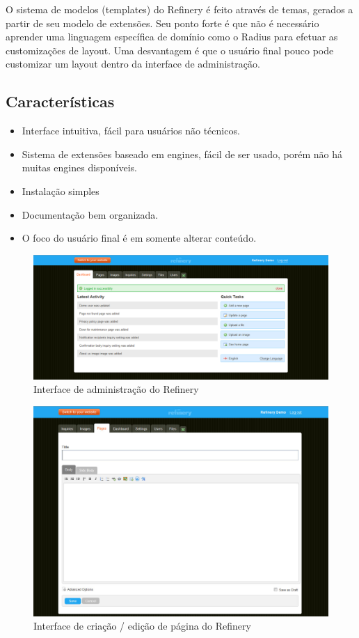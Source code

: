 O sistema de modelos (templates) do Refinery é feito através de temas, gerados a partir de seu modelo de extensões. Seu ponto forte é que não é necessário aprender uma linguagem específica de domínio como o Radius para efetuar as customizações de layout. Uma desvantagem é que o usuário final pouco pode customizar um layout dentro da interface de administração.

\subsection{Características}

\begin{itemize}
  \item Interface intuitiva, fácil para usuários não técnicos.
  \item Sistema de extensões baseado em engines, fácil de ser usado, porém não há muitas engines disponíveis.
  \item Instalação simples
  \item Documentação bem organizada.
  \item O foco do usuário final é em somente alterar conteúdo.
\end{itemize}

\begin{figure}[here]
\includegraphics[width=150mm]{images/refinery_admin.png}
\caption{Interface de administração do Refinery}
\label{fig:refinery_admin.png}
\end{figure}

\begin{figure}[here]
\includegraphics[width=150mm]{images/refinery_new_page.jpg}
\caption{Interface de criação / edição de página do Refinery}
\label{fig:refinery_new_page.jpg}
\end{figure}

